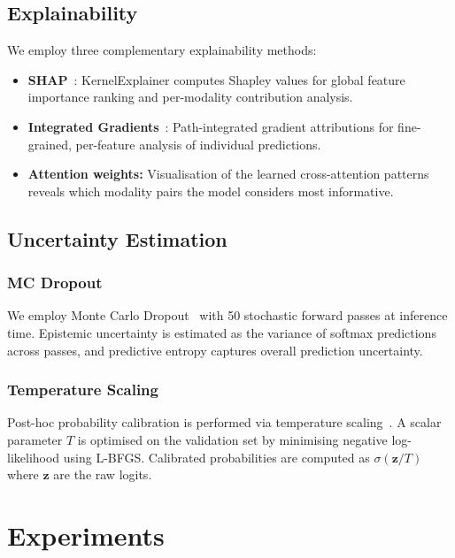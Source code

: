 \documentclass[journal,twoside]{IEEEtran}
\begin{document}
\subsection{Explainability}

We employ three complementary explainability methods:
\begin{itemize}
    \item \textbf{SHAP}~\cite{lundberg2017shap}: KernelExplainer computes
    Shapley values for global feature importance ranking and per-modality
    contribution analysis.
    \item \textbf{Integrated Gradients}~\cite{sundararajan2017ig}: Path-integrated
    gradient attributions for fine-grained, per-feature analysis of individual
    predictions.
    \item \textbf{Attention weights:} Visualisation of the learned cross-attention
    patterns reveals which modality pairs the model considers most informative.
\end{itemize}

\subsection{Uncertainty Estimation}

\subsubsection{MC Dropout}
We employ Monte Carlo Dropout~\cite{gal2016mcdropout} with 50 stochastic
forward passes at inference time. Epistemic uncertainty is estimated as the
variance of softmax predictions across passes, and predictive entropy captures
overall prediction uncertainty.

\subsubsection{Temperature Scaling}
Post-hoc probability calibration is performed via temperature
scaling~\cite{guo2017calibration}. A scalar parameter $T$ is optimised
on the validation set by minimising negative log-likelihood using L-BFGS.
Calibrated probabilities are computed as $\sigma(\mathbf{z} / T)$ where
$\mathbf{z}$ are the raw logits.

\section{Experiments}
\end{document}
